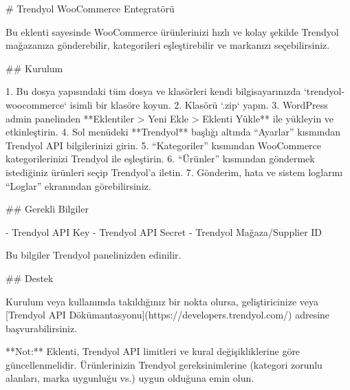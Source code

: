 # Trendyol WooCommerce Entegratörü

Bu eklenti sayesinde WooCommerce ürünlerinizi hızlı ve kolay şekilde Trendyol mağazanıza gönderebilir, kategorileri eşleştirebilir ve markanızı seçebilirsiniz.

## Kurulum

1. Bu dosya yapısındaki tüm dosya ve klasörleri kendi bilgisayarınızda `trendyol-woocommerce` isimli bir klasöre koyun.
2. Klasörü `.zip` yapın.
3. WordPress admin panelinden **Eklentiler > Yeni Ekle > Eklenti Yükle** ile yükleyin ve etkinleştirin.
4. Sol menüdeki **Trendyol** başlığı altında “Ayarlar” kısmından Trendyol API bilgilerinizi girin.
5. “Kategoriler” kısmından WooCommerce kategorilerinizi Trendyol ile eşleştirin.
6. “Ürünler” kısmından göndermek istediğiniz ürünleri seçip Trendyol’a iletin.
7. Gönderim, hata ve sistem loglarını “Loglar” ekranından görebilirsiniz.

## Gerekli Bilgiler

- Trendyol API Key
- Trendyol API Secret
- Trendyol Mağaza/Supplier ID

Bu bilgiler Trendyol panelinizden edinilir.

## Destek

Kurulum veya kullanımda takıldığınız bir nokta olursa, geliştiricinize veya [Trendyol API Dökümantasyonu](https://developers.trendyol.com/) adresine başvurabilirsiniz.

**Not:** Eklenti, Trendyol API limitleri ve kural değişikliklerine göre güncellenmelidir. Ürünlerinizin Trendyol gereksinimlerine (kategori zorunlu alanları, marka uygunluğu vs.) uygun olduğuna emin olun.
